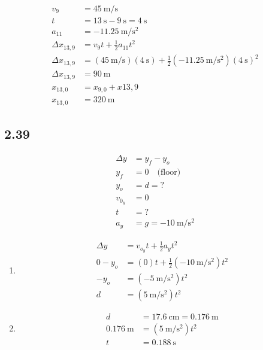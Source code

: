 \documentclass{article}
\begin{document}
\begin{enumerate}[label=\textbf{(\alph*)}]
\begin{align*}
		\end{align*}
		\begin{align*}
			v_9 & = \SI{45}{\meter \per \second} \\
			t & = \SI{13}{\second} - \SI{9}{\second} = \SI{4}{\second} \\
			a_{11} & = \SI{-11.25}{\meter \per \second \squared} \\
			\Delta x_{13,9} & = v_9t + \frac{1}{2}a_{11}t^2 \\
			\Delta x_{13,9} & = (\SI{45}{\meter \per \second})(\SI{4}{\second}) + \frac{1}{2}(\SI{-11.25}{\meter \per \second \squared})(\SI{4}{\second})^2 \\
			\Delta x_{13,9} & = \SI{90}{\meter} \\
			x_{13,0} & = x_{9,0} + x{13,9} \\
			x_{13,0} & = \SI{320}{\meter}
		\end{align*}
\end{enumerate}

\subsection{2.39}
\begin{align*}
	\Delta y & = y_f - y_o \\
	y_f & = 0 \quad \text{(floor)} \\
	y_o & = d = ? \\
	v_{0_y} & = 0 \\
	t & = ? \\
	a_y & = g = \SI{-10}{\meter \per \second \squared}
\end{align*}
\begin{enumerate}[label=\textbf{(\alph*)}]
	\item
		\begin{align*}
			\Delta y & = v_{o_y}t + \frac{1}{2}a_yt^2 \\
			0 - y_o & = (0)t + \frac{1}{2}(\SI{-10}{\meter \per \second \squared})t^2 \\
			-y_o & = (\SI{-5}{\meter \per \second \squared})t^2 \\
			d & = (\SI{5}{\meter \per \second \squared})t^2
		\end{align*}
	\item
		\begin{align*}
			d & = \SI{17.6}{\centi \meter} = \SI{0.176}{\meter} \\
			\SI{0.176}{\meter} & = (\SI{5}{\meter \per \second \squared})t^2 \\
			t & = \SI{0.188}{\second}
		\end{align*}
\end{enumerate}
\end{document}
